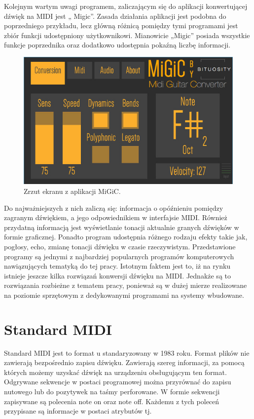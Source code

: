 Kolejnym wartym uwagi programem, zaliczającym się do aplikacji konwertującej dźwięk na  MIDI  jest „ Migic”. Zasada działania aplikacji jest podobna do poprzedniego przykładu, lecz główną różnicą pomiędzy tymi programami jest zbiór funkcji udostępniony użytkownikowi. Mianowicie „Migic” posiada wszystkie funkcje poprzednika oraz dodatkowo udostępnia pokaźną liczbę informacji.

\begin{figure}[h!]
  \centering
  \includegraphics[width=0.5\linewidth]{rys/MIGIC1}
  \caption{Zrzut ekranu z aplikacji MiGiC.}
  \label{fig:schemat}
\end{figure}

Do najważniejszych z nich zaliczą się: informacja o opóźnieniu pomiędzy zagranym dźwiękiem, a jego odpowiednikiem w interfajsie MIDI.
Również przydatną informacją jest wyświetlanie tonacji aktualnie granych dźwięków w formie graficznej. Ponadto program udostępnia różnego rodzaju efekty takie jak, pogłosy, echo, zmianę tonacji dźwięku w czasie rzeczywistym.
Przedstawione programy są jednymi z najbardziej popularnych programów komputerowych nawiązujących tematyką do tej pracy. Istotnym faktem jest to, iż na rynku istnieje jeszcze kilka rozwiązań konwersji dźwięku na MIDI. Jednakże są to rozwiązania rozbieżne z tematem pracy, ponieważ są w dużej mierze realizowane na poziomie sprzętowym z dedykowanymi programami na systemy wbudowane.


\section{{Standard MIDI}}

\cite{MIDI} Standard MIDI jest to format u standaryzowany w 1983 roku. Format plików nie zawierają bezpośrednio zapisu dźwięku. Zawierają szereg informacji, za pomocą których możemy uzyskać dźwięk na urządzeniu obsługującym ten format. Odgrywane sekwencje w postaci programowej można przyrównać do zapisu nutowego lub do pozytywek na taśmy perforowane. W formie sekwencji zapisywane są polecenia note on oraz note off. Każdemu z tych poleceń przypisane są informacje w postaci atrybutów tj.

